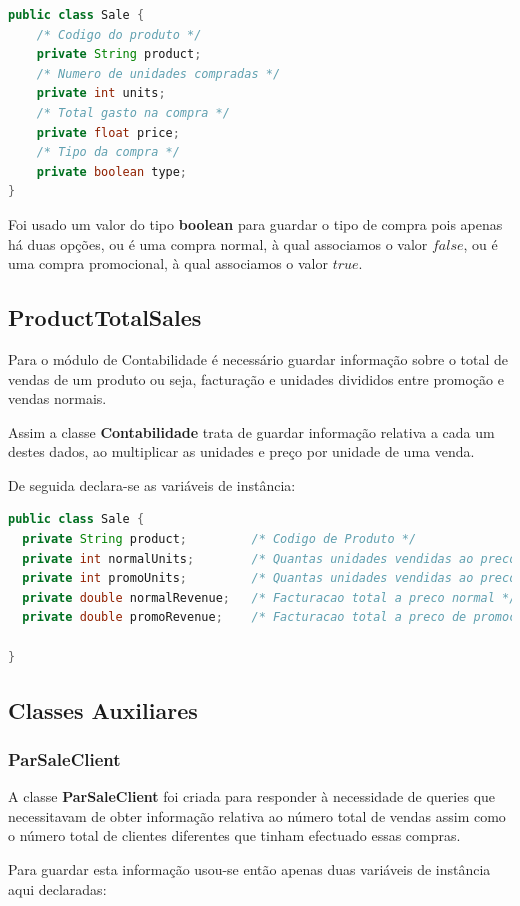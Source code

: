 \documentclass[10pt] {article}
\begin{document}
\begin{lstlisting}[language=Java]
public class Sale {
	/* Codigo do produto */
	private String product;
	/* Numero de unidades compradas */
	private int units;
	/* Total gasto na compra */
	private float price;
	/* Tipo da compra */
	private boolean type;
}
\end{lstlisting}

\par Foi usado um valor do tipo \textbf{boolean} para guardar o tipo de compra pois apenas há duas opções, ou é uma compra
normal, à qual associamos o valor $false$, ou é uma compra promocional, à qual associamos o valor $true$.

\subsection{ProductTotalSales}
\par Para o módulo de Contabilidade é necessário guardar informação sobre o total de vendas de um produto ou seja, facturação e unidades divididos entre promoção e vendas normais.
\par Assim a classe \textbf{Contabilidade} trata de guardar informação relativa a cada um destes dados, ao multiplicar as unidades e preço por unidade de uma venda.
\par De seguida declara-se as variáveis de instância:

\begin{lstlisting}[language=Java]
public class Sale {
  private String product;         /* Codigo de Produto */
  private int normalUnits;        /* Quantas unidades vendidas ao preco normal */
  private int promoUnits;         /* Quantas unidades vendidas ao preco de promocao */
  private double normalRevenue;   /* Facturacao total a preco normal */
  private double promoRevenue;    /* Facturacao total a preco de promocao */

}
\end{lstlisting}

\subsection{Classes Auxiliares}
\subsubsection{ParSaleClient}
\par A classe \textbf{ParSaleClient} foi criada para responder à necessidade de queries que necessitavam de obter informação
relativa ao número total de vendas assim como o número total de clientes diferentes que tinham efectuado essas compras.
\par Para guardar esta informação usou-se então apenas duas variáveis de instância aqui declaradas:
\end{document}
